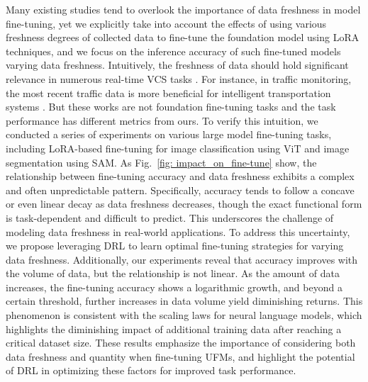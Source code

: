  Many existing studies tend to overlook the importance of data freshness in model fine-tuning, yet we explicitly take into account the effects of using various freshness degrees of collected data to fine-tune the foundation model using LoRA techniques, and we focus on the inference accuracy of such fine-tuned models varying data freshness. Intuitively, the freshness of data should hold significant relevance in numerous real-time VCS tasks \cite{the_reason_why_data_freshness_is_important}. For instance, in traffic monitoring, the most recent traffic data is more beneficial for intelligent transportation systems \cite{a_example_for_the_reason_why_data_freshness_is_important}. But these works are not foundation fine-tuning tasks and the task performance has different metrics from ours. 
To verify this intuition, we conducted a series of experiments on various large model fine-tuning tasks, including LoRA-based fine-tuning for image classification using ViT and image segmentation using SAM. As Fig.~\ref{fig: impact_on_fine-tune} show, the relationship between fine-tuning accuracy and data freshness exhibits a complex and often unpredictable pattern. Specifically, accuracy tends to follow a concave or even linear decay as data freshness decreases, though the exact functional form is task-dependent and difficult to predict. This underscores the challenge of modeling data freshness in real-world applications. To address this uncertainty, we propose leveraging DRL to learn optimal fine-tuning strategies for varying data freshness. Additionally, our experiments reveal that accuracy improves with the volume of data, but the relationship is not linear. As the amount of data increases, the fine-tuning accuracy shows a logarithmic growth, and beyond a certain threshold, further increases in data volume yield diminishing returns. This phenomenon is consistent with the scaling laws for neural language models\cite{kaplan2020scaling}, which highlights the diminishing impact of additional training data after reaching a critical dataset size. These results emphasize the importance of considering both data freshness and quantity when fine-tuning UFMs, and highlight the potential of DRL in optimizing these factors for improved task performance.

